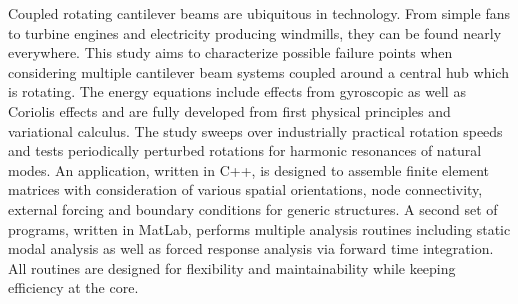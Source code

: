 Coupled rotating cantilever beams are ubiquitous in technology. From simple fans to turbine engines and electricity producing windmills, they can be found nearly everywhere. This study aims to characterize possible failure points when considering multiple cantilever beam systems coupled around a central hub which is rotating. The energy equations include effects from gyroscopic as well as Coriolis effects and are fully developed from first physical principles and variational calculus. The study sweeps over industrially practical rotation speeds and tests periodically perturbed rotations for harmonic resonances of natural modes. An application, written  in C++, is designed to assemble finite element matrices with consideration of various spatial orientations, node connectivity, external forcing and boundary conditions for generic structures. A second set of programs, written in MatLab, performs multiple analysis routines including static modal analysis as well as forced response analysis via forward time integration. All routines are designed for flexibility and maintainability while keeping efficiency at the core.


